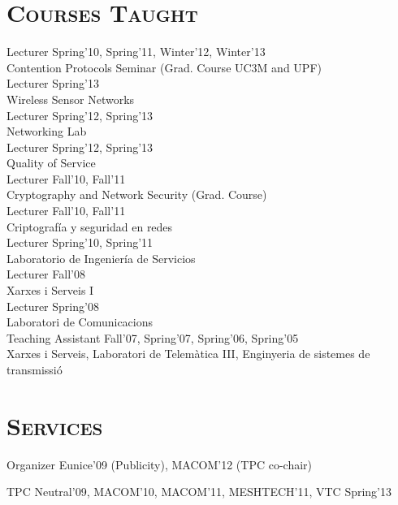 \documentclass[line,margin]{res}
\begin{document}
\begin{resume}
\section{\textsc{Courses Taught}}
Lecturer
\hfill {Spring'10, Spring'11, Winter'12, Winter'13}\\
Contention Protocols Seminar (Grad. Course UC3M and UPF)\\
\newline
Lecturer
\hfill {Spring'13}\\
Wireless Sensor Networks\\
\newline
Lecturer
\hfill {Spring'12, Spring'13}\\
Networking Lab\\
\newline
Lecturer
\hfill {Spring'12, Spring'13}\\
Quality of Service\\
\newline
Lecturer
\hfill {Fall'10, Fall'11}\\
Cryptography and Network Security (Grad. Course) \\
\newline
Lecturer
\hfill {Fall'10, Fall'11}\\
Criptografía y seguridad en redes\\
\newline
Lecturer
\hfill {Spring'10, Spring'11}\\
Laboratorio de Ingeniería de Servicios\\
\newline
Lecturer
\hfill {Fall'08}\\
Xarxes i Serveis I\\
\newline
Lecturer
\hfill {Spring'08}\\
Laboratori de Comunicacions\\
\newline
Teaching Assistant
\hfill {Fall'07, Spring'07, Spring'06, Spring'05}\\
Xarxes i Serveis, Laboratori de Telemàtica III, Enginyeria de sistemes de transmissió

\section{\textsc{Services}}
Organizer
\hfill {Eunice'09 (Publicity), MACOM'12 (TPC co-chair)}

TPC
\hfill {Neutral'09, MACOM'10, MACOM'11, MESHTECH'11, VTC Spring'13}


\end{resume}
\end{document}
